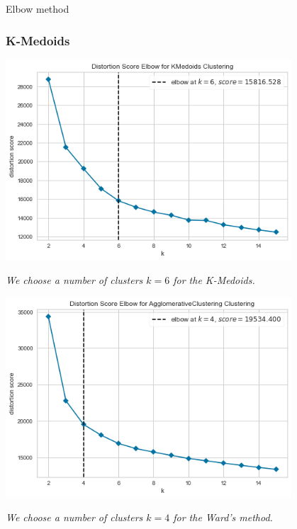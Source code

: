 \documentclass[10pt]{beamer}
\begin{document}
\begin{frame}{Elbow method}
	\subsubsection{K-Medoids}
	\begin{minipage}{0.55\textwidth}
		\centering
		\includegraphics[width=0.8\textwidth]{../Images/MMedoidsElbow.png}
	\end{minipage}
	\begin{minipage}{0.3\textwidth}
		\itshape\scriptsize
		We choose a number of clusters $k=6$ for the K-Medoids.
	\end{minipage}
	\begin{minipage}{0.55\textwidth}
		\centering
		\includegraphics[width=0.8\textwidth]{../Images/MHierElbow.png}
	\end{minipage}
	\begin{minipage}{0.3\textwidth}
		\itshape\scriptsize
		We choose a number of clusters $k=4$ for the Ward's method.
	\end{minipage}
\end{frame}
\end{document}
